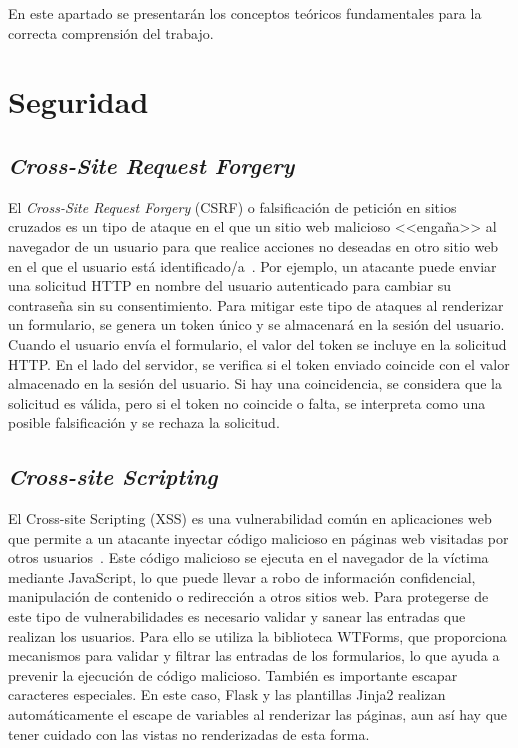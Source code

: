 
En este apartado se presentarán los conceptos teóricos fundamentales para la correcta comprensión del trabajo.

\section{Seguridad}
\subsection{\textit{Cross-Site Request Forgery}}
El \textit{Cross-Site Request Forgery} (CSRF) o  falsificación de petición en sitios cruzados es un tipo de ataque en el que un sitio web malicioso <<engaña>> al navegador de un usuario para que realice acciones no deseadas en otro sitio web en el que el usuario está identificado/a~\cite{wiki:csrf}.
Por ejemplo, un atacante puede enviar una solicitud HTTP en nombre del usuario autenticado para cambiar su contraseña sin su consentimiento.
Para mitigar este tipo de ataques al renderizar un formulario, se genera un token único y se almacenará en la sesión del usuario.
Cuando el usuario envía el formulario, el valor del token se incluye en la solicitud HTTP. 
En el lado del servidor, se verifica si el token enviado coincide con el valor almacenado en la sesión del usuario. 
Si hay una coincidencia, se considera que la solicitud es válida, pero si el token no coincide o falta, se interpreta como una posible falsificación y se rechaza la solicitud.

\subsection{\textit{Cross-site Scripting}}
El Cross-site Scripting (XSS) es una vulnerabilidad común en aplicaciones web que permite a un atacante inyectar código malicioso en páginas web visitadas por otros usuarios~\cite{wiki:xss}.
Este código malicioso se ejecuta en el navegador de la víctima mediante JavaScript, lo que puede llevar a robo de información confidencial, manipulación de contenido o redirección a otros sitios web.
Para protegerse de este tipo de vulnerabilidades es necesario validar y sanear las entradas que realizan los usuarios. 
Para ello se utiliza la biblioteca WTForms, que proporciona mecanismos para validar y filtrar las entradas de los formularios, lo que ayuda a prevenir la ejecución de código malicioso.
También es importante escapar caracteres especiales.
En este caso, Flask y las plantillas Jinja2 realizan automáticamente el escape de variables al renderizar las páginas, aun así hay que tener cuidado con las vistas no renderizadas de esta forma.

